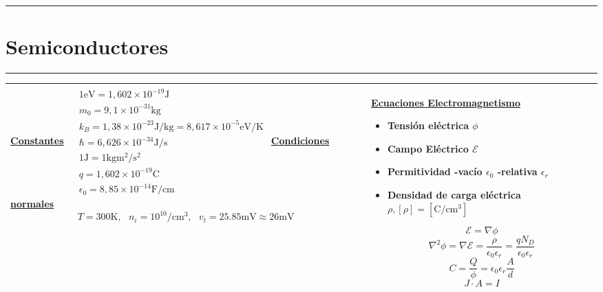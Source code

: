 \documentclass[../main.tex]{subfiles}
\begin{document}
\everymath{\displaystyle}
\hrule
\vspace*{-\baselineskip}
\vspace{0.05in}
\section{Semiconductores}
\hrule
\begin{xltabular}{\textwidth}{|X|X|}
	\hline
	\underline{\textbf{Constantes}}
	\newline\newline
	$\begin{aligned}
			 & 1 \si{\electronvolt} =  1,602\times 10^{-19} \si{\J}                           \\
			 & m_0 = 9,1 \times 10^{-31} \si{\kg}                                             \\
			 & k_B = 1,38 \times 10^{-23} \si{\J\per\kg} = 8,617\times 10^{-5} \si{\eV\per\K} \\
			 & \hbar = 6,626 \times 10^{-34} \si{\J\per\s}                                    \\
			 & 1 \si{\J} = 1 \si{\kg\square\m\per\square\s}                                   \\
			 & q = 1,602 \times 10^{-19} \si{\coulomb}                                        \\
			 & \epsilon_0 = 8,85 \times 10^{-14} \si{\F\per\cm}
		\end{aligned}$
	\newline\newline
	\underline{\textbf{Condiciones normales}}
	$$T = 300\si{\K}, ~~~ n_i = 10^{10} \si{\per\cubic\cm}, ~~~ v_t = 25.85\si{\mV} \approx 26 \si{\mV}$$
	&
	\underline{\textbf{Ecuaciones Electromagnetismo}}
	\begin{itemize}
		\item Tensión eléctrica $\phi$
		\item Campo Eléctrico $\mathcal{E}$
		\item Permitividad -vacío $\epsilon_0$  -relativa $\epsilon_r$
		\item Densidad de carga eléctrica $\rho , [\rho] = [\si{\coulomb\per\cubic\cm}]$
	\end{itemize}
	$$\mathcal{E} = \nabla\phi$$
	$$\nabla^2\phi = \nabla\mathcal{E} = \frac{\rho}{\epsilon_0\epsilon_r} = \frac{qN_D}{\epsilon_0\epsilon_r}$$
	$$C = \frac{Q}{\phi} = \epsilon_0\epsilon_r \frac{A}{d}$$
	$$J\cdot A = I$$
	\\
	\hline
\end{xltabular}
\end{document}

